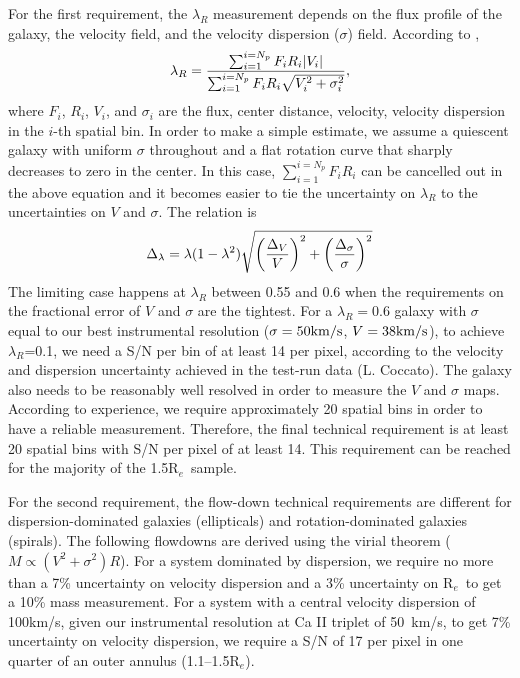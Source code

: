 \documentclass[preprint,11pt]{aastex}
\newcommand{\Reff}{{R$_{e}$}}
\begin{document}
 For the first requirement, the $\lambda_R$
measurement depends on the flux profile of the galaxy, the velocity
field, and the velocity dispersion ($\sigma$) field. According to
\cite{emsellem07},
\begin{equation}
\lambda_R = {\sum_{i=1}^{i=N_p} F_i R_i |V_i| \over \sum_{i=1}^{i=N_p} F_i R_i \sqrt{V_i^2+\sigma_i^2}} ,
\end{equation} 
where $F_i$, $R_i$, $V_i$, and $\sigma_i$ are the flux, center
distance, velocity, velocity dispersion in the $i$-th spatial bin. In
order to make a simple estimate, we assume a quiescent galaxy with
uniform $\sigma$ throughout and a flat rotation curve that sharply
decreases to zero in the center. In this case, $\sum_{i=1}^{i=N_p} F_i
R_i$ can be cancelled out in the above equation and it becomes easier
to tie the uncertainty on $\lambda_R$ to the uncertainties on $V$ and
$\sigma$. The relation is
\begin{equation}
\Delta_\lambda = \lambda (1-\lambda^2) \sqrt{\left({\Delta_V \over V}\right)^2+\left({\Delta_\sigma \over \sigma}\right)^2}
\end{equation}
The limiting case happens at $\lambda_R$ between 0.55 and 0.6 when the
requirements on the fractional error of $V$ and $\sigma$ are the
tightest. For a $\lambda_R=0.6$ galaxy with $\sigma$ equal to our best
instrumental resolution ($\sigma=50 {\rm km/s}$, $V=38{\rm km/s}$), to
achieve $\lambda_R$=0.1, we need a S/N per bin of at least 14 per
pixel, according to the velocity and dispersion uncertainty achieved
in the test-run data (L. Coccato). The galaxy also needs to be
reasonably well resolved in order to measure the $V$ and $\sigma$
maps. According to experience, we require approximately 20 spatial
bins in order to have a reliable measurement. Therefore, the final
technical requirement is at least 20 spatial bins with S/N per pixel
of at least 14. This requirement can be reached for the majority of
the 1.5\Reff\ sample.

 For the second requirement, the flow-down
technical requirements are different for dispersion-dominated galaxies
(ellipticals) and rotation-dominated galaxies (spirals). The following
flowdowns are derived using the virial theorem ($M\propto
(V^2+\sigma^2) R$). For a system dominated by dispersion, we require
no more than a 7\% uncertainty on velocity dispersion and a 3\%
uncertainty on \Reff\ to get a 10\% mass measurement.  For a system
with a central velocity dispersion of 100km/s, given our instrumental
resolution at Ca II triplet of 50~km/s, to get 7\% uncertainty on
velocity dispersion, we require a S/N of 17 per pixel in one quarter
of an outer annulus (1.1--1.5\Reff).
\end{document}
